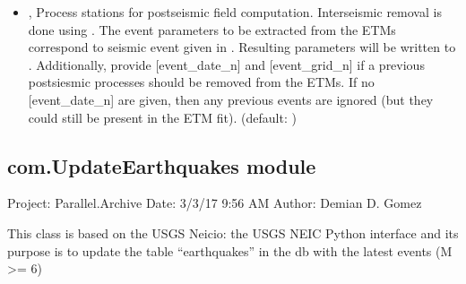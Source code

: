 \documentclass[letterpaper,10pt,english]{sphinxmanual}
\begin{document}
\begin{itemize}
\item {} 
\sphinxAtStartPar
{\hyperref[\detokenize{com:TrajectoryFit.py--postseismic}]{}} , {\hyperref[\detokenize{com:TrajectoryFit.py---postseismic_process}]{}}  \sphinxhyphen{} Process stations for postseismic field computation. Interseismic removal is done using . The event parameters to be extracted from the ETMs correspond to seismic event given in . Resulting parameters will be written to . Additionally, provide {[}event\_date\_n{]} and {[}event\_grid\_n{]} if a previous postsiesmic processes should be removed from the ETMs. If no {[}event\_date\_n{]} are given, then any previous events are ignored (but they could still be present in the ETM fit). (default: )

\end{itemize}


\subsection{com.UpdateEarthquakes module}
\label{\detokenize{com:module-com.UpdateEarthquakes}}\label{\detokenize{com:com-updateearthquakes-module}}
\sphinxAtStartPar
Project: Parallel.Archive
Date: 3/3/17 9:56 AM
Author: Demian D. Gomez

\sphinxAtStartPar
This class is based on the USGS Neicio: the USGS NEIC Python interface and its
purpose is to update the table “earthquakes” in the db with the latest
events (M \textgreater{}= 6)
\end{document}

